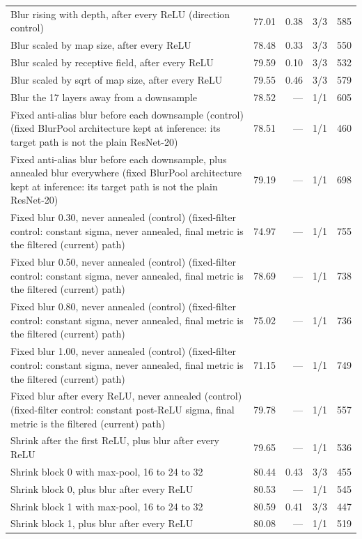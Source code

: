 \documentclass[10pt]{article}
\begin{document}
\begin{longtable}{@{}>{\raggedright\arraybackslash}p{9.2cm}rrcr@{}}
Blur rising with depth, after every ReLU (direction control) & 77.01 & 0.38 & 3/3 & 585\\
Blur scaled by map size, after every ReLU & 78.48 & 0.33 & 3/3 & 550\\
Blur scaled by receptive field, after every ReLU & 79.59 & 0.10 & 3/3 & 532\\
Blur scaled by sqrt of map size, after every ReLU & 79.55 & 0.46 & 3/3 & 579\\
Blur the 17 layers away from a downsample & 78.52 & --- & 1/1 & 605\\
Fixed anti-alias blur before each downsample (control) (fixed BlurPool architecture kept at inference: its target path is not the plain ResNet-20) & 78.51 & --- & 1/1 & 460\\
Fixed anti-alias blur before each downsample, plus annealed blur everywhere (fixed BlurPool architecture kept at inference: its target path is not the plain ResNet-20) & 79.19 & --- & 1/1 & 698\\
Fixed blur 0.30, never annealed (control) (fixed-filter control: constant sigma, never annealed,  final metric is the filtered (current) path) & 74.97 & --- & 1/1 & 755\\
Fixed blur 0.50, never annealed (control) (fixed-filter control: constant sigma, never annealed,  final metric is the filtered (current) path) & 78.69 & --- & 1/1 & 738\\
Fixed blur 0.80, never annealed (control) (fixed-filter control: constant sigma, never annealed,  final metric is the filtered (current) path) & 75.02 & --- & 1/1 & 736\\
Fixed blur 1.00, never annealed (control) (fixed-filter control: constant sigma, never annealed,  final metric is the filtered (current) path) & 71.15 & --- & 1/1 & 749\\
Fixed blur after every ReLU, never annealed (control) (fixed-filter control: constant post-ReLU sigma,  final metric is the filtered (current) path) & 79.78 & --- & 1/1 & 557\\
Shrink after the first ReLU, plus blur after every ReLU & 79.65 & --- & 1/1 & 536\\
Shrink block 0 with max-pool, 16 to 24 to 32 & 80.44 & 0.43 & 3/3 & 455\\
Shrink block 0, plus blur after every ReLU & 80.53 & --- & 1/1 & 545\\
Shrink block 1 with max-pool, 16 to 24 to 32 & 80.59 & 0.41 & 3/3 & 447\\
Shrink block 1, plus blur after every ReLU & 80.08 & --- & 1/1 & 519\\

\end{longtable}
\end{document}
